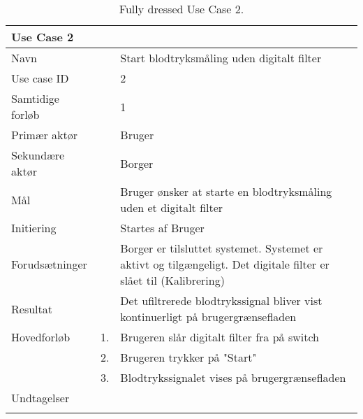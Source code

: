 \begin{longtabu} to  %
    {\large \textbf{Use Case 2}} && \\
    \toprule
    Navn &&    Start blodtryksmåling uden digitalt filter\\
    Use case ID &&    2\\
    Samtidige forløb &&    1\\
    Primær aktør &&    Bruger\\
    Sekundære aktør &&	Borger \\
    Mål &&    Bruger ønsker at starte en blodtryksmåling uden et digitalt filter\\
    Initiering &&	Startes af Bruger\\
    Forudsætninger &&  Borger er tilsluttet systemet. Systemet er aktivt og tilgængeligt. Det digitale filter er slået til (Kalibrering)  \\
    Resultat &&		Det ufiltrerede blodtrykssignal bliver vist kontinuerligt på brugergrænsefladen                         \\ \midrule
    Hovedforløb &    1. &    Brugeren slår digitalt filter fra på switch\\[-1ex]   						 	
                &    2. &    Brugeren trykker på "Start"\\[-1ex]
                &    3.	&	 Blodtrykssignalet vises på brugergrænsefladen\newline\\ \midrule
                
    Undtagelser &     &      \\ \bottomrule
\caption{Fully dressed Use Case 2.}
\label{UC2}
\end{longtabu}


